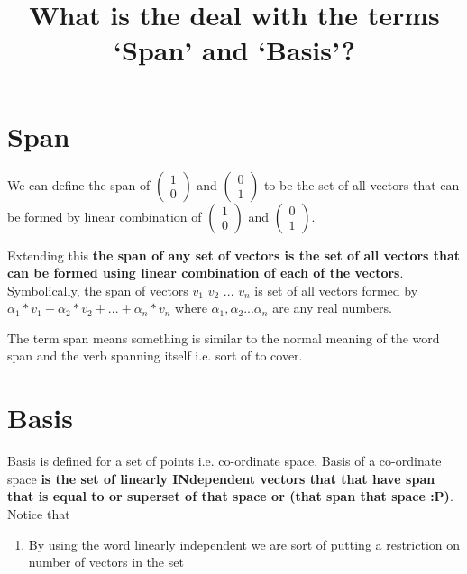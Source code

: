 \documentclass[12pt]{article}
\title{What is the deal with the terms `Span' and `Basis'?}
\author{}
\newcommand{\comment}[1]{}
\begin{document}
\maketitle

\section{Span}
We can define the span of $ \comment{column vector: 1, 0} \begin{pmatrix}1 \\  0\end{pmatrix}  $ and $ \comment{column vector: 0, 1} \begin{pmatrix} 0 \\  1 \end{pmatrix} $ to be the set of all vectors that can be formed by linear combination of $ \comment{column vector: 1, 0} \begin{pmatrix}1 \\  0\end{pmatrix}  $ and $ \comment{column vector: 0, 1} \begin{pmatrix} 0 \\  1 \end{pmatrix} $.

Extending this \textbf{the span of any set of vectors is the set of all vectors that can be formed using linear combination of each of the vectors}. Symbolically, the span of vectors $ v_1 $ $ v_2 $ ... $ v_n $ is set of all vectors formed by $ \alpha_1 * v_1 + \alpha_2 * v_2 + ... + \alpha_n * v_n $ where $ \alpha_1, \alpha_2 ... \alpha_n $ are any real numbers.

The term span means something is similar to the normal meaning of the word span and the verb spanning itself i.e. sort of to cover.

\section{Basis}
Basis is defined for a set of points i.e. co-ordinate space. Basis of a co-ordinate space \textbf{is the set of linearly INdependent vectors that that have span that is equal to or superset of that space or (that span that space :P)}. Notice that
\begin{enumerate}
  \item By using the word linearly independent we are sort of putting a restriction on number of vectors in the set
\end{enumerate}
\end{document}
